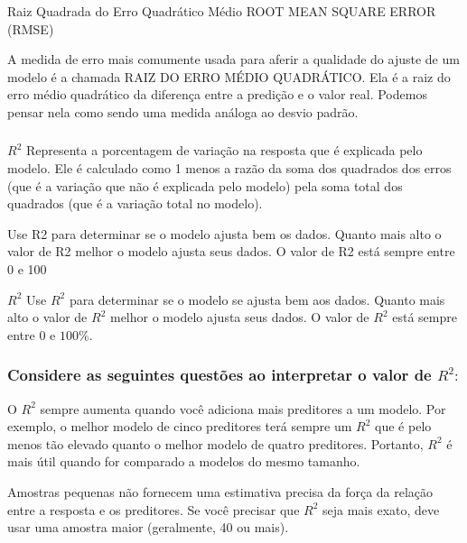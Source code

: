 \documentclass[14pt,aspectratio=1610]{beamer}
\begin{document}
\begin{frame}{}
\frametitle{ }
\begin{block}{Raiz Quadrada do Erro Quadrático Médio}
\justifying
ROOT MEAN SQUARE ERROR (RMSE)

A medida de erro mais comumente usada para aferir a qualidade do ajuste de um modelo é a chamada RAIZ DO ERRO MÉDIO QUADRÁTICO. Ela é a raiz do erro médio quadrático da diferença entre a predição e o valor real. Podemos pensar nela como sendo uma medida análoga ao desvio padrão.
 
\end{block}
\end{frame}

\begin{frame}{}
\frametitle{ }
\begin{block}{$R^2$}
\justifying
Representa a porcentagem de variação na resposta que é explicada pelo modelo. Ele é calculado como 1 menos a razão da soma dos quadrados dos erros (que é a variação que não é explicada pelo modelo) pela soma total dos quadrados (que é a variação total no modelo). 

Use R2 para determinar se o modelo ajusta bem os dados. Quanto mais alto o valor de R2 melhor o modelo ajusta seus dados. O valor de R2 está sempre entre 0 e 100%
\end{block}\pause
\begin{block}{$R^2$}
\justifying
Use $R^{2}$ para determinar se o modelo se ajusta bem aos dados. Quanto mais alto o valor de $R^{2}$ melhor o modelo ajusta seus dados. O valor de $R^{2}$ está sempre entre 0 e $100\%.$
\end{block}
\end{frame}


\begin{frame}{}
\frametitle{Considere as seguintes questões ao interpretar o valor de $R^{2}:$}
\begin{block}{}
\justifying
O $R^{2}$ sempre aumenta quando você adiciona mais preditores a um modelo. Por exemplo, o melhor modelo de cinco preditores terá sempre um $R^{2}$ que é pelo menos tão elevado quanto o melhor modelo de quatro preditores. Portanto, $R^{2}$ é mais útil quando for comparado a modelos do mesmo tamanho. 
\end{block}\pause
\begin{block}{}
\justifying
Amostras pequenas não fornecem uma estimativa precisa da força da relação entre a resposta e os preditores. Se você precisar que $R^{2}$ seja mais exato, deve usar uma amostra maior (geralmente, 40 ou mais). 
\end{block}
\end{frame}
\end{document}
